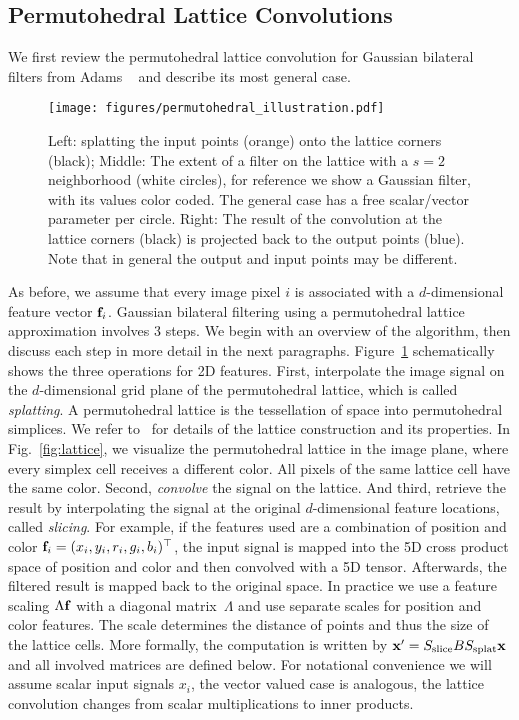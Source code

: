 \subsection{Permutohedral Lattice Convolutions}

We first review the permutohedral lattice convolution for
Gaussian bilateral filters from Adams \etal~\cite{adams2010fast} and
describe its most general case.

\begin{figure}[t]
\begin{center}
\centerline{\texttt{[image: figures/permutohedral\_illustration.pdf]}}
  {Left: splatting the input
  points (orange) onto the lattice corners (black); Middle: The extent of a filter on the lattice
   with a $s=2$ neighborhood (white circles), for reference we show a Gaussian filter,
   with its values color coded. The general case has a free scalar/vector parameter per circle.
    Right: The result of the convolution at the lattice corners (black) is projected back
    to the output points (blue). Note that in general the output and input points may be different. \label{fig:ops}}
\end{center}
\end{figure}

As before, we assume that every image pixel $i$ is associated with a $d$-dimensional
feature vector $\mathbf{f}_i$. Gaussian bilateral filtering using a permutohedral lattice
approximation involves 3 steps. We begin with an overview of the algorithm, then discuss each step
in more detail in the next paragraphs. Figure~\ref{fig:ops} schematically shows
the three operations for 2D features. First, interpolate the image signal on the
$d$-dimensional grid plane of the permutohedral lattice, which is called
\emph{splatting}. A permutohedral lattice is the tessellation of space into permutohedral simplices.
We refer to~\cite{adams2010fast} for details of the lattice construction and its properties.
In Fig.~\ref{fig:lattice}, we visualize
the permutohedral lattice in the image plane, where every simplex cell receives a different color. All pixels of the same
lattice cell have the same color. Second, \emph{convolve} the signal on the lattice.
And third, retrieve the result by interpolating the signal at the original
$d$-dimensional feature locations, called \emph{slicing}. For example, if
the features used are a combination of position and color $\mathbf{f}_i = (x_i, y_i, r_i, g_i,
b_i)^{\top}$, the input signal is mapped into the 5D cross product space of position and
color and then convolved with a 5D tensor. Afterwards, the filtered result is mapped back to the
original space. In practice we use a feature scaling $\Lambda \mathbf{f}$ with a diagonal matrix~$\Lambda$
and use separate scales
for position and color features. The scale determines the distance of points and thus the size
of the lattice cells.
More formally, the computation is written by $\mathbf{x}' =
S_{\text{slice}}BS_{\text{splat}} \mathbf{x}$ and all involved matrices are
defined below. For notational convenience we will assume scalar input signals $x_i$, the vector valued case
is analogous, the lattice convolution changes from scalar multiplications to inner products.

